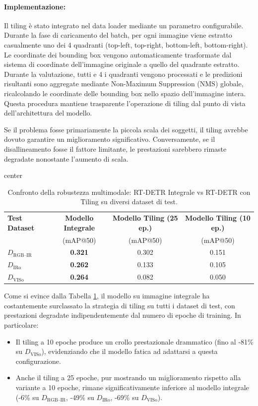 \documentclass[a4paper,12pt]{article}
\begin{document}
\paragraph{Implementazione:} 
Il tiling è stato integrato nel data loader mediante un parametro configurabile. Durante la fase di caricamento del batch, per ogni immagine viene estratto casualmente uno dei 4 quadranti (top-left, top-right, bottom-left, bottom-right). Le coordinate dei bounding box vengono automaticamente trasformate dal sistema di coordinate dell'immagine originale a quello del quadrante estratto. Durante la valutazione, tutti e 4 i quadranti vengono processati e le predizioni risultanti sono aggregate mediante Non-Maximum Suppression (NMS) globale, ricalcolando le coordinate delle bounding box nello spazio dell'immagine intera. Questa procedura mantiene trasparente l'operazione di tiling dal punto di vista dell'architettura del modello.

Se il problema fosse primariamente la piccola scala dei soggetti, il tiling avrebbe dovuto garantire un miglioramento significativo. Conversamente, se il disallineamento fosse il fattore limitante, le prestazioni sarebbero rimaste degradate nonostante l'aumento di scala.

\begin{table}[H]
\centering
\caption{Confronto della robustezza multimodale: RT-DETR Integrale vs RT-DETR con Tiling su diversi dataset di test.}
\label{tab:rtdetr_comparison_tiling}
\begin{adjustbox}{center}
\begin{tabular}{lccc}
\toprule
\textbf{Test Dataset} & \textbf{Modello Integrale} & \textbf{Modello Tiling (25 ep.)} & \textbf{Modello Tiling (10 ep.)}\\
& (mAP@50) & (mAP@50) & (mAP@50) \\
\midrule
$D_{\text{RGB--IR}}$ & \textbf{0.321} & 0.302 & 0.151 \\
$D_{\text{IRo}}$ & \textbf{0.262} & 0.133 & 0.105 \\
$D_{\text{VISo}}$ & \textbf{0.264} & 0.082 & 0.050\\
\bottomrule
\end{tabular}
\end{adjustbox}
\end{table}

Come si evince dalla Tabella \ref{tab:rtdetr_comparison_tiling}, il modello su immagine integrale ha costantemente surclassato la strategia di tiling su tutti i dataset di test, con prestazioni degradate indipendentemente dal numero di epoche di training. In particolare:
\begin{itemize}
    \item Il tiling a 10 epoche produce un crollo prestazionale drammatico (fino al -81\% su $D_{\text{VISo}}$), evidenziando che il modello fatica ad adattarsi a questa configurazione.
    \item Anche il tiling a 25 epoche, pur mostrando un miglioramento rispetto alla variante a 10 epoche, rimane significativamente inferiore al modello integrale (-6\% su $D_{\text{RGB--IR}}$, -49\% su $D_{\text{IRo}}$, -69\% su $D_{\text{VISo}}$).
\end{itemize}
\end{document}
